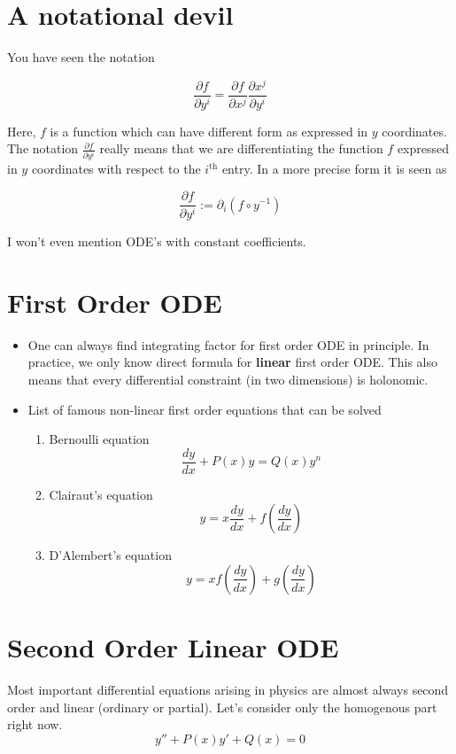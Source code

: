 \documentclass{report}
\begin{document}
\section{A notational devil}

You have seen the notation 

$$\frac{\partial f}{\partial y^i}  = \frac{\partial f}{\partial x^j}\frac{\partial x^j}{\partial y^i}$$

\noindent Here, $f$ is a function which can have different form as expressed in $y$ coordinates. The notation $\frac{\partial f}{\partial y^i}$ really means that we are differentiating the function $f$ expressed in $y$ coordinates with respect to the $i^{\mathrm{th}}$ entry. In a more precise form it is seen as 

$$\frac{\partial f}{\partial y^i} := \partial_i(f\circ y^{-1})$$

\noindent I won't even mention ODE's with constant coefficients.
\section{First Order ODE}

\begin{itemize}
  \item One can always find integrating factor for first order ODE in principle. In practice, we only know direct formula for \textbf{linear} first order ODE. This also means that every differential constraint (in two dimensions) is holonomic.

  \item List of famous non-linear first order equations that can be solved

    \begin{enumerate}
      \item Bernoulli equation
        $$\frac{dy}{dx} + P(x)y = Q(x)y^n$$
      \item Clairaut's equation
        $$y = x\frac{dy}{dx} + f\left(\frac{dy}{dx}\right)$$
      \item D'Alembert's equation
        $$y = xf\left(\frac{dy}{dx}\right) + g\left(\frac{dy}{dx}\right)$$
    \end{enumerate}

\end{itemize}

\section{Second Order Linear ODE}
Most important differential equations arising in physics are almost always second order and linear (ordinary or partial). Let's consider only the homogenous part right now.
$$y'' + P(x)y' + Q(x) = 0$$
\end{document}
